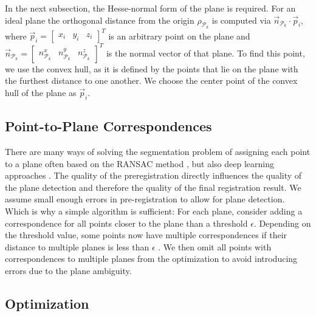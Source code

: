 In the next subsection, the Hesse-normal form of the plane is required.
For an ideal plane the orthogonal distance from the origin $\rho_{\mathcal{P}_k}$ is computed via $\vec{n}_{\mathcal{P}_k}\cdot\vec{p}_i$, where $\vec{p}_i = \begin{bmatrix}x_i&y_i&z_i\end{bmatrix}^T$ is an arbitrary point on the plane and $\vec{n}_{\mathcal{P}_k} = \begin{bmatrix}n_{\mathcal{P}_k}^x&n_{\mathcal{P}_k}^y&n_{\mathcal{P}_k}^z\end{bmatrix}^T$ is the normal vector of that plane.
To find this point, we use the convex hull, as it is defined by the points that lie on the plane with the furthest distance to one another.
We choose the center point of the convex hull of the plane as $\vec{p}_i$.

\subsection{Point-to-Plane Correspondences}\label{sec:point-to-plane-correspondences}

There are many ways of solving the segmentation problem of assigning each point to a plane often based on the RANSAC method \cite{Honti2018}, \cite{Gaspers2011} but also deep learning approaches \cite{Engelmann2018}.
The quality of the preregistration directly influences the quality of the plane detection and therefore the quality of the final registration result. 
We assume small enough errors in pre-registration to allow for plane detection.
Which is why a simple algorithm is sufficient:
For each plane, consider adding a correspondence for all points closer to the plane than a threshold $\epsilon$.
Depending on the threshold value, some points now have multiple correspondences if their distance to multiple planes is less than $\epsilon$ . We then omit all points with correspondences to multiple planes from the optimization to avoid introducing errors due to the plane ambiguity.

\subsection{Optimization}

